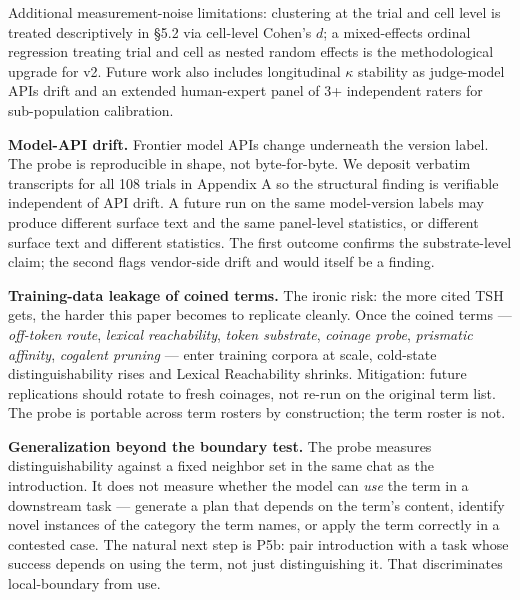 \documentclass[11pt,a4paper]{article}
\begin{document}
Additional measurement-noise limitations: clustering at the trial and cell level is treated descriptively in \S5.2 via cell-level Cohen's $d$; a mixed-effects ordinal regression treating trial and cell as nested random effects is the methodological upgrade for v2. Future work also includes longitudinal $\kappa$ stability as judge-model APIs drift and an extended human-expert panel of 3+ independent raters for sub-population calibration.

\textbf{Model-API drift.} Frontier model APIs change underneath the version label. The probe is reproducible in shape, not byte-for-byte. We deposit verbatim transcripts for all 108 trials in Appendix A so the structural finding is verifiable independent of API drift. A future run on the same model-version labels may produce different surface text and the same panel-level statistics, or different surface text and different statistics. The first outcome confirms the substrate-level claim; the second flags vendor-side drift and would itself be a finding.

\textbf{Training-data leakage of coined terms.} The ironic risk: the more cited TSH gets, the harder this paper becomes to replicate cleanly. Once the coined terms --- \textit{off-token route}, \textit{lexical reachability}, \textit{token substrate}, \textit{coinage probe}, \textit{prismatic affinity}, \textit{cogalent pruning} --- enter training corpora at scale, cold-state distinguishability rises and Lexical Reachability shrinks. Mitigation: future replications should rotate to fresh coinages, not re-run on the original term list. The probe is portable across term rosters by construction; the term roster is not.

\textbf{Generalization beyond the boundary test.} The probe measures distinguishability against a fixed neighbor set in the same chat as the introduction. It does not measure whether the model can \textit{use} the term in a downstream task --- generate a plan that depends on the term's content, identify novel instances of the category the term names, or apply the term correctly in a contested case. The natural next step is P5b: pair introduction with a task whose success depends on using the term, not just distinguishing it. That discriminates local-boundary from use.
\end{document}

